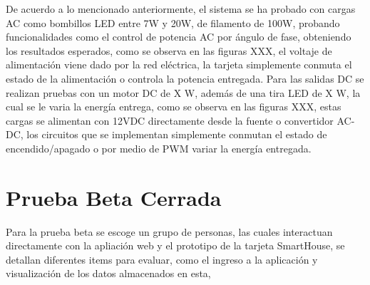 De acuerdo a lo mencionado anteriormente, el sistema se ha probado con cargas AC como bombillos LED entre 7W y 20W, de filamento de 100W, probando funcionalidades como el control de potencia AC por ángulo de fase, obteniendo los resultados esperados, como se observa en las figuras XXX, el voltaje de alimentación viene dado por la red eléctrica, la tarjeta simplemente conmuta el estado de la alimentación o controla la potencia entregada. Para las salidas DC se realizan pruebas con un motor DC de X W, además de una tira LED de X W, la cual se le varia la energía entrega, como se observa en las figuras XXX, estas cargas se alimentan con 12VDC directamente desde la fuente o convertidor AC-DC, los circuitos que se implementan simplemente conmutan el estado de encendido/apagado o por medio de PWM variar la energía entregada.

\section{Prueba Beta Cerrada}

Para la prueba beta se escoge un grupo de personas, las cuales interactuan directamente con la apliación web y el prototipo de la tarjeta SmartHouse, se detallan diferentes items para evaluar, como el ingreso a la aplicación y visualización de los datos almacenados en esta,